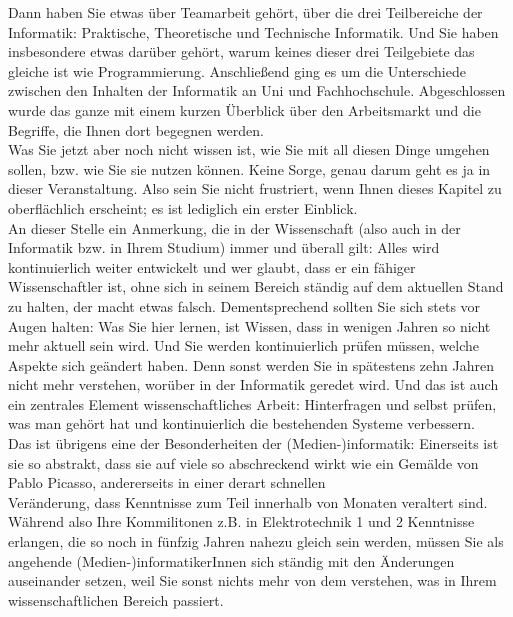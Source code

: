 Dann haben Sie etwas über Teamarbeit gehört, über die drei Teilbereiche der Informatik: Praktische, Theoretische und Technische Informatik. Und Sie haben insbesondere etwas darüber gehört, warum keines dieser drei Teilgebiete das gleiche ist wie Programmierung. Anschließend ging es um die Unterschiede zwischen den Inhalten der Informatik an Uni und Fachhochschule. Abgeschlossen wurde das ganze mit einem kurzen Überblick über den Arbeitsmarkt und die Begriffe, die Ihnen dort begegnen werden.\\

Was Sie jetzt aber noch nicht wissen ist, wie Sie mit all diesen Dinge umgehen sollen, bzw. wie Sie sie nutzen können. Keine Sorge, genau darum geht es ja in dieser Veranstaltung. Also sein Sie nicht frustriert, wenn Ihnen dieses Kapitel zu oberflächlich erscheint; es ist lediglich ein erster Einblick. \\

An dieser Stelle ein Anmerkung, die in der Wissenschaft (also auch in der Informatik bzw. in Ihrem Studium) immer und überall gilt: Alles wird kontinuierlich weiter entwickelt und wer glaubt, dass er ein fähiger Wissenschaftler ist, ohne sich in seinem Bereich ständig auf dem aktuellen Stand zu halten, der macht etwas falsch. Dementsprechend sollten Sie sich stets vor Augen halten: Was Sie hier lernen, ist Wissen, dass in wenigen Jahren so nicht mehr aktuell sein wird. Und Sie werden kontinuierlich prüfen müssen, welche Aspekte sich geändert haben. Denn sonst werden Sie in spätestens zehn Jahren nicht mehr verstehen, worüber in der Informatik geredet wird. Und das ist auch ein zentrales Element wissenschaftliches Arbeit: Hinterfragen und selbst prüfen, was man gehört hat und kontinuierlich die bestehenden Systeme verbessern. \\

Das ist übrigens eine der Besonderheiten der (Medien-)informatik: Einerseits ist sie so abstrakt, dass sie auf viele so abschreckend wirkt wie ein Gemälde von Pablo Picasso, andererseits in einer derart schnellen\\Veränderung, dass Kenntnisse zum Teil innerhalb von Monaten veraltert sind. Während also Ihre Kommilitonen z.B. in Elektrotechnik 1 und 2 Kenntnisse erlangen, die so noch in fünfzig Jahren nahezu gleich sein werden, müssen Sie als angehende (Medien-)informatikerInnen sich ständig mit den Änderungen auseinander setzen, weil Sie sonst nichts mehr von dem verstehen, was in Ihrem wissenschaftlichen Bereich passiert.\\

